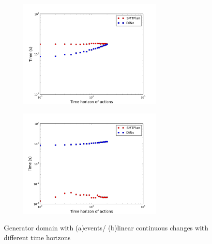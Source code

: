 \begin{figure}[tbp!]
\centering
\begin{subfigure}[b]{0.49\textwidth}
\includegraphics[width=0.80\textwidth]{Generator_event.png}
\caption{}
\label{fig:Picture4}
\end{subfigure}
\hfill
\begin{subfigure}[b]{0.48\textwidth}
\includegraphics[width=0.80\textwidth]{Generator_linear.png}
\caption{}
\label{fig:Picture3}
\end{subfigure}
\caption{Generator domain with (a)events/ (b)linear continuous changes with different time horizons}
\end{figure}

